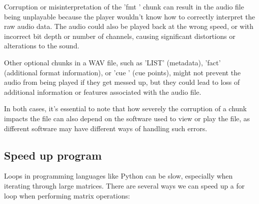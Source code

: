 \documentclass{article}
\begin{document}
Corruption or misinterpretation of the 'fmt ' chunk can result in the audio file being unplayable because the player wouldn't know how to correctly interpret the raw audio data. The audio could also be played back at the wrong speed, or with incorrect bit depth or number of channels, causing significant distortions or alterations to the sound.

Other optional chunks in a WAV file, such as 'LIST' (metadata), 'fact' (additional format information), or 'cue ' (cue points), might not prevent the audio from being played if they get messed up, but they could lead to loss of additional information or features associated with the audio file.

In both cases, it's essential to note that how severely the corruption of a chunk impacts the file can also depend on the software used to view or play the file, as different software may have different ways of handling such errors.


\subsection{Speed up program}
Loops in programming languages like Python can be slow, especially when iterating through large matrices. There are several ways we can speed up a for loop when performing matrix operations:
\end{document}
